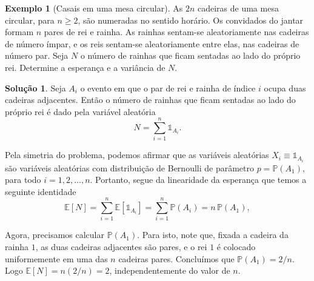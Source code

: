 \documentclass[12pt,portuguese]{article}
\theoremstyle{definition}
\newtheorem{example}[example]{Exemplo}
\newtheorem*{solution}{Solução}
\begin{document}
\begin{example}[Casais em uma mesa circular]\label{ex:mesa-circular}
As $2n$ cadeiras de uma mesa circular, para $n\geqslant 2$, são numeradas no sentido horário.
Os convidados do jantar formam $n$ pares de rei e rainha. As rainhas
sentam-se aleatoriamente nas cadeiras de número ímpar, e os reis
sentam-se aleatoriamente entre elas, nas cadeiras de número par. Seja
$N$ o número de rainhas que ficam sentadas ao lado do próprio rei.
Determine a esperança e a variância de $N$.

\begin{solution}
Seja $A_i$ o evento em que o par de rei e rainha de índice $i$ ocupa duas
cadeiras adjacentes. Então o número de rainhas que ficam sentadas ao lado do próprio rei é dado
pela variável aleatória
\begin{equation}\label{eq:mesa-n-indicadoras}
N = \sum_{i=1}^{n} \mathds{1}_{A_i}.
\end{equation}

Pela simetria do problema, podemos afirmar que
as variáveis aleatórias $X_i\equiv \mathds{1}_{A_i}$ são 
variáveis aleatórias com distribuição de Bernoulli de parâmetro $p=\mathbb{P}(A_1)$,
para todo $i=1,2,\ldots , n$.
Portanto, segue da linearidade da esperança que temos a seguinte identidade
\[
\mathbb{E}[N] = \sum_{i=1}^{n} \mathbb{E}[\mathds{1}_{A_i}]
= \sum_{i=1}^{n} \mathbb{P}(A_i) = n \, \mathbb{P}(A_1),
\]

Agora, precisamos calcular $\mathbb{P}(A_1)$. Para isto, note que, fixada a
cadeira da rainha $1$, as duas cadeiras adjacentes são pares, e o
rei $1$ é colocado uniformemente em uma das $n$ cadeiras pares.
Concluímos que $\mathbb{P}(A_1) = 2/n$. Logo
$\mathbb{E}[N] = n(2/n) = 2$, independentemente do valor de $n$.


\end{solution}
\end{example}
\end{document}
